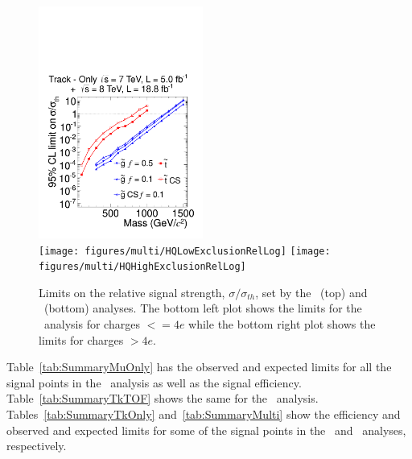 \begin{figure}
\centering
  \includegraphics[clip=false, trim=0.0cm 0cm 0.0cm 0cm, width=0.48\textwidth]{figures/tkonly/TkExclusionRelLog} \\
  \texttt{[image: figures/multi/HQLowExclusionRelLog]}
  \texttt{[image: figures/multi/HQHighExclusionRelLog]}
\caption[Limits on the relative signal strength, $\sigma/\sigma_{th}$, set by the \tkonly\ and \multi\ analyses]
{Limits on the relative signal strength, $\sigma/\sigma_{th}$,  set by the \tkonly\ (top) and \multi\ (bottom) analyses.
The bottom left plot shows the limits for the \multi\ analysis for charges $<= 4e$ while the bottom right plot shows the limits for charges $> 4e$.
}
    \label{fig:TkRelExclusion}
\end{figure}

Table~\ref{tab:SummaryMuOnly} has the observed and expected limits for all the signal points in the \muononly\ analysis as well as the signal efficiency. 
Table~\ref{tab:SummaryTkTOF} shows the same for the \tktof\ analysis. Tables~\ref{tab:SummaryTkOnly} and~\ref{tab:SummaryMulti} show the efficiency
and observed and expected limits for some of the signal points in the \tkonly\ and \multi\ analyses, respectively.

